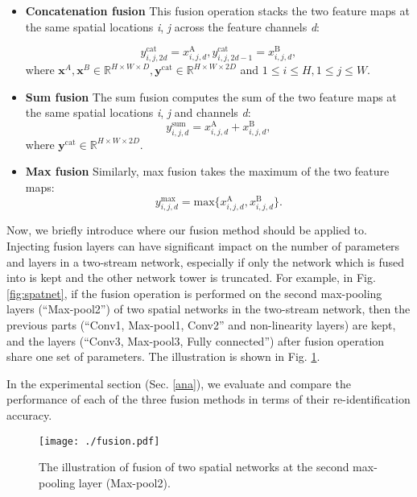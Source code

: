 \documentclass[journal]{IEEEtran}
\begin{document}
\begin{itemize}
	\item \textbf{Concatenation fusion}  This fusion operation stacks the two feature maps at the same spatial locations \textit{i}, \textit{j} across the feature channels \textit{d}:

\begin{equation}\label{concf}
y_{i,j,2d}^{\mathrm{cat}}= x_{i,j,d}^{\mathrm{A}} ,  y_{i,j,2d-1}^{\mathrm{cat}} =  x_{i,j,d}^{\mathrm{B}},
\end{equation}		
where $\textbf{x}^{A}, \textbf{x}^{B}\in\mathbb{R}^{H \times W \times D} , \textbf{y}^{\mathrm{cat}} \in \mathbb{R}^{H \times W \times 2D}$ and $1\leq i \leq H,1\leq j \leq W$.
	\\
	\item \textbf{Sum fusion} The sum fusion computes the sum of the two feature maps at the same spatial locations \textit{i}, \textit{j }and channels \textit{d}:
\begin{equation}\label{sumf}
y_{i,j,d}^{\mathrm{sum}}= x_{i,j,d}^{\mathrm{A}} + x_{i,j,d}^{\mathrm{B}},
\end{equation}		
	where $ \textbf{y}^{\mathrm{cat}} \in \mathbb{R}^{H \times W \times 2D}$. 
	\item \textbf{Max fusion}
	Similarly, max fusion takes the maximum of the two feature maps:
	\begin{equation}\label{convf}
	y_{i,j,d}^{\mathrm{max}}=\mathrm{max} \{ x_{i,j,d}^{\mathrm{A}} , x_{i,j,d}^{\mathrm{B}} \} .
	\end{equation}
\end{itemize}	

Now, we briefly introduce where our fusion method should be applied to. Injecting fusion layers can have significant impact on the number of parameters and layers in a two-stream network, especially if only the network which is fused into is kept and the other network tower is truncated. For example, in Fig. \ref{fig:spatnet}, if the fusion operation is performed on the second max-pooling layers  (``Max-pool2'') of two spatial networks in the two-stream network, then the previous parts (``Conv1, Max-pool1, Conv2'' and non-linearity layers) are kept, and the layers (``Conv3, Max-pool3, Fully connected'') after fusion operation share one set of parameters. The illustration is shown in Fig. \ref{fig:fusion}.
	
In the experimental section (Sec. \ref{ana}), we evaluate and compare the performance of each of the three fusion methods in terms of their re-identification accuracy.
\begin{figure}[htb]
	\centering
	\texttt{[image: ./fusion.pdf]}
	\caption{The illustration of fusion of two spatial networks at the second max-pooling layer (Max-pool2).}
	
	\label{fig:fusion}
\end{figure}
\end{document}
